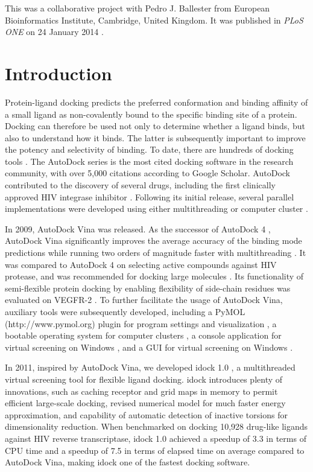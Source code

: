 This was a collaborative project with Pedro J. Ballester from European Bioinformatics Institute, Cambridge, United Kingdom. It was published in \textit{PLoS ONE} on 24 January 2014 \citep{1362}.

\section{Introduction}

Protein-ligand docking predicts the preferred conformation and binding affinity of a small ligand as non-covalently bound to the specific binding site of a protein. Docking can therefore be used not only to determine whether a ligand binds, but also to understand how it binds. The latter is subsequently important to improve the potency and selectivity of binding. To date, there are hundreds of docking tools \citep{493,922}. The AutoDock series \citep{597,596,595} is the most cited docking software in the research community, with over 5,000 citations according to Google Scholar. AutoDock contributed to the discovery of several drugs, including the first clinically approved HIV integrase inhibitor \citep{1169}. Following its initial release, several parallel implementations were developed using either multithreading or computer cluster \citep{115,560,782}.%

In 2009, AutoDock Vina \citep{595} was released. As the successor of AutoDock 4 \citep{596}, AutoDock Vina significantly improves the average accuracy of the binding mode predictions while running two orders of magnitude faster with multithreading \citep{595}. It was compared to AutoDock 4 on selecting active compounds against HIV protease, and was recommended for docking large molecules \citep{556}. Its functionality of semi-flexible protein docking by enabling flexibility of side-chain residues was evaluated on VEGFR-2 \citep{1084}. To further facilitate the usage of AutoDock Vina, auxiliary tools were subsequently developed, including a PyMOL (http://www.pymol.org) plugin for program settings and visualization \citep{609}, a bootable operating system for computer clusters \citep{773}, a console application for virtual screening on Windows \citep{1268}, and a GUI for virtual screening on Windows \citep{1250}.

In 2011, inspired by AutoDock Vina, we developed idock 1.0 \citep{1153}, a multithreaded virtual screening tool for flexible ligand docking. idock introduces plenty of innovations, such as caching receptor and grid maps in memory to permit efficient large-scale docking, revised numerical model for much faster energy approximation, and capability of automatic detection of inactive torsions for dimensionality reduction. When benchmarked on docking 10,928 drug-like ligands against HIV reverse transcriptase, idock 1.0 achieved a speedup of 3.3 in terms of CPU time and a speedup of 7.5 in terms of elapsed time on average compared to AutoDock Vina, making idock one of the fastest docking software.

